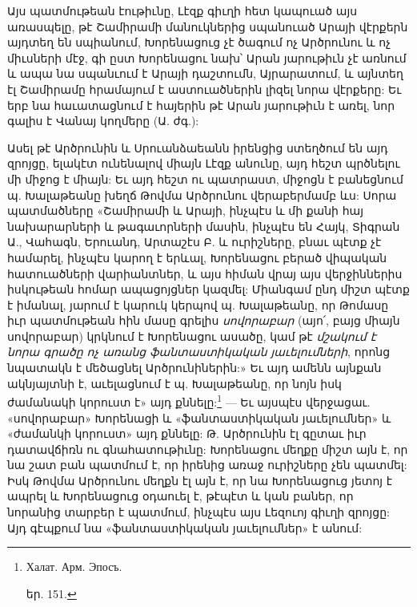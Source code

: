\documentclass{article}
\begin{document}
{Այս պատմութեան էութիւնը, Լէզք գիւղի հետ կապուած այս առասպելը, թէ Շամիրամի մանուկներից սպանուած Արայի վէրքերն այդտեղ են սպիանում, Խորենացուց չէ ծագում ոչ Արծրունու և ոչ միւսների մէջ, գի ըստ Խորենացու նախ՝ Արան յարութիւն չէ առնում և ապա նա սպանւում է Արայի դաշտումն, Այրարատում, և այնտեղ էլ Շամիրամը հրամայում է աստուածներին լիզել նորա վէրքերը: Եւ երբ նա հաւատացնում է հայերին թէ Արան յարութիւն է առել, նոր գալիս է Վանայ կողմերը (Ա. ժգ.):

Ասել թէ Արծրունին և Սրուանձաեանն իրենցից ստեղծում են այդ զրոյցը, ելակէտ ունենալով միայն Լէզք անունը, այդ հեշտ պրծնելու մի միջոց է միայն: Եւ այդ հեշտ ու պատրաստ, միջոցն է բանեցնում պ. Խալաթեանը խեղճ Թովմա Արծրունու վերաբերմամբ ևս: Սորա պատմածները «Շամիրամի և Արայի, ինչպէս և մի քանի հայ նախարարների և թագաւորների մասին, ինչպէս են Հայկ, Տիգրան Ա., Վահագն, Երուանդ, Արտաշէս Բ. և ուրիշները, բնաւ պէտք չէ համարել, ինչպէս կարող է երևալ, Խորենացու բերած վիպական հատուածների վարիանտներ, և այս հիման վրայ այս վերջիններիս իսկութեան հոմար ապացոյցներ կազմել: Միանգամ ընդ միշտ պէտք է իմանալ, յարում է կարուկ կերպով պ. Խալաթեանը, որ Թոմասը իւր պատմութեան հին մասը գրելիս \emph{սովորաբար} (այո՛, բայց միայն սովորաբար) կրկնում է Խորենացու ասածը, կամ թէ \emph{մշակում է նորա գրածը ոչ առանց ֆանտաստիկական յաւելումների}, որոնց նպատակն է մեծացնել Արծրունիներին:» Եւ այդ ամենն այնքան ակնյայտնի է, աւելացնում է պ. Խալաթեանը, որ նոյն իսկ ժամանակի կորուստ է» այդ քննելը:\footnote{\begin{russian}Халат. Арм. Эпосъ.\end{russian} եր. 151.} — Եւ այսպէս վերջացաւ. «սովորաբար» Խորենացի և «ֆանտաստիկական յաւելումներ» և «ժամանկի կորուստ» այդ քննելը: Թ. Արծրունին էլ գըտաւ իւր դատավճիռն ու գնահատութիւնը: Խորենացու մեղքը միշտ այն է, որ նա շատ բան պատմում է, որ իրենից առաջ ուրիշները չեն պատմել: Իսկ Թովմա Արծրունու մեղքն էլ այն է, որ նա Խորենացուց յետոյ է ապրել և Խորենացուց օդաուել է, թէպէտ և կան բաներ, որ նորանից տարբեր է պատմում, ինչպէս այս Լեզուոյ գիւղի զրոյցը: Այդ գէպքում նա «ֆանտաստիկական յաւելումներ» է անում:

}
\end{document}
